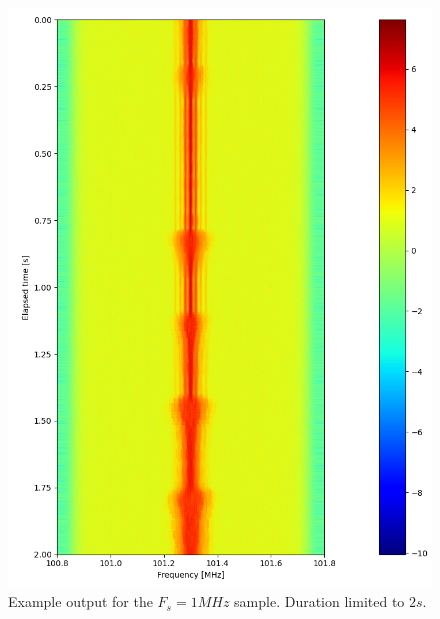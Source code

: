 \begin{figure}[h]
    \centering
    \includegraphics[width=\textwidth,keepaspectratio]{figures/waterfall-2.png}
    \caption{Example output for the $F_s = 1MHz$ sample. Duration limited to $2s$.}
    \label{fig:spectrogram}
\end{figure}


